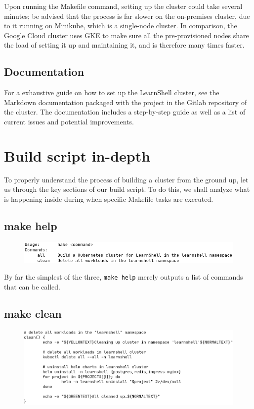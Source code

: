 \documentclass[thesis=B,english]{FITthesis}[2019/12/23]
\begin{document}
Upon running the Makefile command, setting up the cluster could take several minutes; be advised that the process is far slower on the on-premises cluster, due to it running on Minikube, which is a single-node cluster. In comparison, the Google Cloud cluster uses GKE to make sure all the pre-provisioned nodes share the load of setting it up and maintaining it, and is therefore many times faster.

\subsection{Documentation}

For a exhaustive guide on how to set up the LearnShell cluster, see the Markdown documentation packaged with the project in the Gitlab repository of the cluster. The documentation includes a step-by-step guide as well as a list of current issues and potential improvements.

\section{Build script in-depth}

To properly understand the process of building a cluster from the ground up, let us through the key sections of our build script. To do this, we shall analyze what is happening inside during when specific Makefile tasks are executed.

\subsection{make help}

\begin{figure}[H]
\centering
\hspace*{-0.5cm}
\includegraphics[scale=0.5]{build-help}
\end{figure}

By far the simplest of the three, \verb|make help| merely outputs a list of commands that can be called.

\subsection{make clean}

\begin{figure}[H]
\centering
\hspace*{-0.5cm}
\includegraphics[scale=0.5]{build-clean}
\end{figure}
\end{document}
